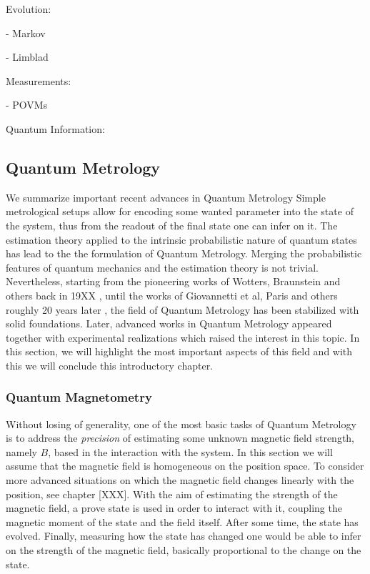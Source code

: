 Evolution:

- Markov

- Limblad

Measurements:

- POVMs

Quantum Information:

\subsection{Quantum Metrology}

We summarize important recent advances in Quantum Metrology
Simple metrological setups allow for encoding some wanted parameter into the state of the system, thus from the readout of the final state one can infer on it.
The estimation theory applied to the intrinsic probabilistic nature of quantum states has lead to the the formulation of Quantum Metrology.
Merging the probabilistic features of quantum mechanics and the estimation theory is not trivial.
Nevertheless, starting from the pioneering works of Wotters, Braunstein and others back in 19XX \citep{}, until the works of Giovannetti et al, Paris and others roughly 20 years later \citep{}, the field of Quantum Metrology has been stabilized with solid foundations.
Later, advanced works in Quantum Metrology appeared \citep{} together with experimental realizations \citep{} which raised the interest in this topic.
In this section, we will highlight the most important aspects of this field and with this we will conclude this introductory chapter.

\subsubsection{Quantum Magnetometry}
\label{sec:bg-quantum-metro}

Without losing of generality, one of the most basic tasks of Quantum Metrology is to address the \emph{precision} of estimating some unknown magnetic field strength, namely $B$, based in the interaction with the system.
In this section we will assume that the magnetic field is homogeneous on the position space.
To consider more advanced situations on which the magnetic field changes linearly with the position, see chapter [XXX].
With the aim of estimating the strength of the magnetic field, a prove state is used in order to interact with it, coupling the magnetic moment of the state and the field itself.
After some time, the state has evolved.
Finally, measuring how the state has changed one would be able to infer on the strength of the magnetic field, basically proportional to the change on the state.

